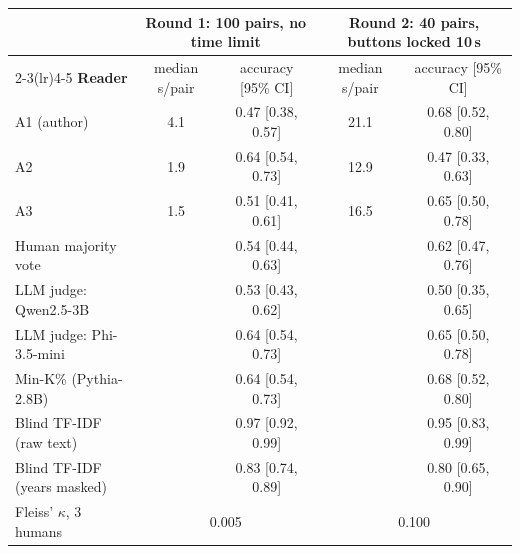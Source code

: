 \begin{tabular}{@{}lcccc@{}}
\toprule
& \multicolumn{2}{c}{\textbf{Round 1}: 100 pairs, no time limit} & \multicolumn{2}{c}{\textbf{Round 2}: 40 pairs, buttons locked 10\,s} \\
\cmidrule(lr){2-3}\cmidrule(lr){4-5}
\textbf{Reader} & median s/pair & accuracy [95\% CI] & median s/pair & accuracy [95\% CI] \\
\midrule
A1 (author) & 4.1 & 0.47 [0.38, 0.57] & 21.1 & 0.68 [0.52, 0.80] \\
A2 & 1.9 & 0.64 [0.54, 0.73] & 12.9 & 0.47 [0.33, 0.63] \\
A3 & 1.5 & 0.51 [0.41, 0.61] & 16.5 & 0.65 [0.50, 0.78] \\
Human majority vote &  & 0.54 [0.44, 0.63] &  & 0.62 [0.47, 0.76] \\
\midrule
LLM judge: Qwen2.5-3B &  & 0.53 [0.43, 0.62] &  & 0.50 [0.35, 0.65] \\
LLM judge: Phi-3.5-mini &  & 0.64 [0.54, 0.73] &  & 0.65 [0.50, 0.78] \\
Min-K\% (Pythia-2.8B) &  & 0.64 [0.54, 0.73] &  & 0.68 [0.52, 0.80] \\
Blind TF-IDF (raw text) &  & 0.97 [0.92, 0.99] &  & 0.95 [0.83, 0.99] \\
Blind TF-IDF (years masked) &  & 0.83 [0.74, 0.89] &  & 0.80 [0.65, 0.90] \\
\midrule
Fleiss' $\kappa$, 3 humans & \multicolumn{2}{c}{0.005} & \multicolumn{2}{c}{0.100} \\
\bottomrule
\end{tabular}
